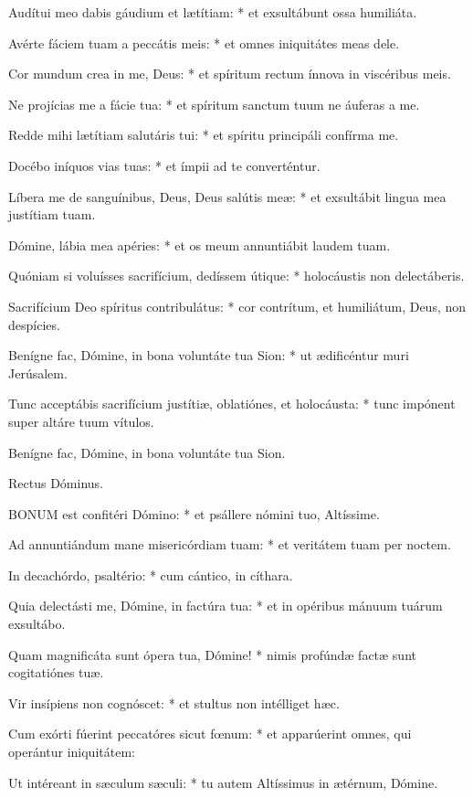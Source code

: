 Audítui meo dabis gáudium et lætítiam: * et exsultábunt ossa humiliáta.

Avérte fáciem tuam a peccátis meis: * et omnes iniquitátes meas dele.

Cor mundum crea in me, Deus: * et spíritum rectum ínnova in viscéribus meis.

Ne projícias me a fácie tua: * et spíritum sanctum tuum ne áuferas a me.

Redde mihi lætítiam salutáris tui: * et spíritu principáli confírma me.

Docébo iníquos vias tuas: * et ímpii ad te converténtur.

Líbera me de sanguínibus, Deus, Deus salútis meæ: * et exsultábit lingua mea justítiam tuam.

Dómine, lábia mea apéries: * et os meum annuntiábit laudem tuam.

Quóniam si voluísses sacrifícium, dedíssem útique: * holocáustis non delectáberis.

Sacrifícium Deo spíritus contribulátus: * cor contrítum, et humiliátum, Deus, non despícies.

Benígne fac, Dómine, in bona voluntáte tua Sion: * ut ædificéntur muri Jerúsalem.

Tunc acceptábis sacrifícium justítiæ, oblatiónes, et holocáusta: * tunc impónent super altáre tuum vítulos.

 Benígne fac, Dómine, in bona voluntáte tua Sion.

 Rectus Dóminus.


\lettrine[lines=2]{B}{ONUM} est confitéri Dómino: * et psállere nómini tuo, Altíssime.

Ad annuntiándum mane misericórdiam tuam: * et veritátem tuam per noctem.

In decachórdo, psaltério: * cum cántico, in cíthara.

Quia delectásti me, Dómine, in factúra tua: * et in opéribus mánuum tuárum exsultábo.

Quam magnificáta sunt ópera tua, Dómine! * nimis profúndæ factæ sunt cogitatiónes tuæ.

Vir insípiens non cognóscet: * et stultus non intélliget hæc.

Cum exórti fúerint peccatóres sicut fœnum: * et apparúerint omnes, qui operántur iniquitátem:

Ut intéreant in sæculum sæculi: * tu autem Altíssimus in ætérnum, Dómine.


